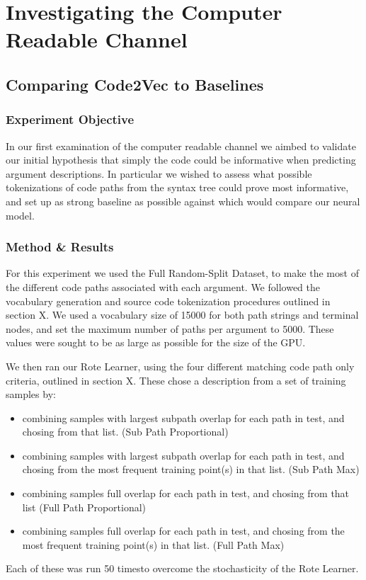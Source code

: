 \section{Investigating the Computer Readable Channel} %
\label{sec:investigating_the_computer_channel}

\subsection{Comparing Code2Vec to Baselines} %
\label{sub:comparing_code2vec_to_baselines}


\subsubsection{Experiment Objective} %

In our first examination of the computer readable channel we aimbed to validate our initial hypothesis that simply the code could be informative when predicting argument descriptions.
In particular we wished to assess what possible tokenizations of code paths from the syntax tree could prove most informative, and set up as strong baseline as possible against which would compare our neural model.



\subsubsection{Method \& Results} %

For this experiment we used the Full Random-Split Dataset, to make the most of the different code paths associated with each argument.
We followed the vocabulary generation and source code tokenization procedures outlined in section X. 
We used a vocabulary size of 15000 for both path strings and terminal nodes, and set the maximum number of paths per argument to  5000.
These values were sought to be as large as possible for the size of the GPU. 

We then ran our Rote Learner, using the four different matching code path only criteria, outlined in section X. 
These chose a description from a set of training samples by:
    \begin{itemize}
        \item combining samples with largest subpath overlap for each path in test, and chosing from that list. (Sub Path Proportional)
        \item combining samples with largest subpath overlap for each path in test, and chosing from the most frequent training point(s) in that list. (Sub Path Max)
        \item combining samples full overlap for each path in test, and chosing from that list (Full Path Proportional)
        \item combining samples full overlap for each path in test, and chosing from the most frequent training point(s) in that list. (Full Path Max)
    \end{itemize}
Each of these was run 50 timesto overcome the stochasticity of the Rote Learner.

